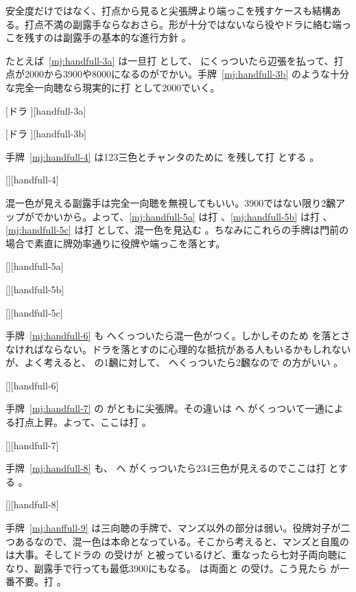 \documentclass[../nankiru_main.tex]{subfiles}
\begin{document}
安全度だけではなく、打点から見ると尖張牌より端っこを残すケースも結構ある。打点不満の副露手ならなおさら。形が十分ではないなら役やドラに絡む端っこを残すのは副露手の基本的な進行方針 \citep{yoteru-pointup-1}。

たとえば~\ref{mj:handfull-3a} は一旦打  として、 にくっついたら辺張を払って、打点が2000から3900や8000になるのがでかい。手牌~\ref{mj:handfull-3b} のような十分な完全一向聴なら現実的に打  として2000でいく。

[ドラ ][handfull-3a]

[ドラ ][handfull-3b]

手牌~\ref{mj:handfull-4} は123三色とチャンタのために  を残して打  とする \citep{yoteru-pointup-1}。

[][handfull-4]

混一色が見える副露手は完全一向聴を無視してもいい。3900ではない限り2飜アップがでかいから。よって、\ref{mj:handfull-5a} は打 、\ref{mj:handfull-5b} は打 、\ref{mj:handfull-5c} は打  として、混一色を見込む 。ちなみにこれらの手牌は門前の場合で素直に牌効率通りに役牌や端っこを落とす。

[][handfull-5a]

[][handfull-5b]

[][handfull-5c]

手牌~\ref{mj:handfull-6} も  へくっついたら混一色がつく。しかしそのため  を落とさなければならない。ドラを落とすのに心理的な抵抗がある人もいるかもしれないが、よく考えると、 の1飜に対して、 へくっついたら2飜なので  の方がいい \citep{yoteru-pointup-2}。

[][handfull-6]

手牌~\ref{mj:handfull-7} の  がともに尖張牌。その違いは  へ  がくっついて一通による打点上昇。よって、ここは打  \citep{yoteru-pointup-2}。

[][handfull-7]

手牌~\ref{mj:handfull-8} も、 へ  がくっついたら234三色が見えるのでここは打  とする \citep{yoteru-pointup-2}。

[][handfull-8]

手牌~\ref{mj:hanffull-9} は三向聴の手牌で、マンズ以外の部分は弱い。役牌対子が二つあるなので、混一色は本命となっている。そこから考えると、マンズと自風の  は大事。そしてドラの  の受けが  と被っているけど、重なったら七対子両向聴になり、副露手で行っても最低3900にもなる。 は両面と  の受け。こう見たら  が一番不要。打  \citep{uzaku-20250416}。
\end{document}
